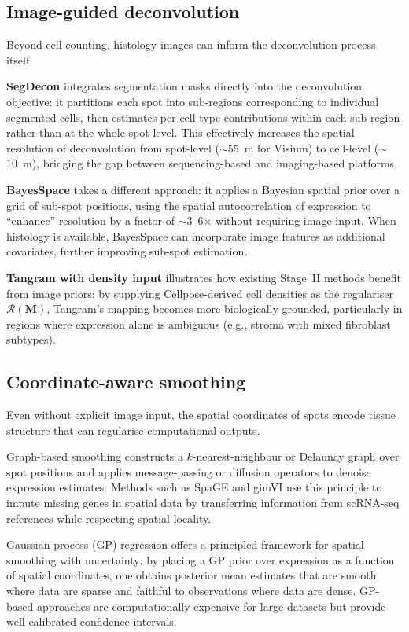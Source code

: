 \subsection{Image-guided deconvolution}

Beyond cell counting, histology images can inform the deconvolution process itself.

\textbf{SegDecon} integrates segmentation masks directly into the deconvolution objective: it partitions each spot into sub-regions corresponding to individual segmented cells, then estimates per-cell-type contributions within each sub-region rather than at the whole-spot level. This effectively increases the spatial resolution of deconvolution from spot-level ($\sim$55~\textmu m for Visium) to cell-level ($\sim$10~\textmu m), bridging the gap between sequencing-based and imaging-based platforms.

\textbf{BayesSpace} \citep{zhao2022bulk2space} takes a different approach: it applies a Bayesian spatial prior over a grid of sub-spot positions, using the spatial autocorrelation of expression to ``enhance'' resolution by a factor of $\sim$3--6$\times$ without requiring image input. When histology is available, BayesSpace can incorporate image features as additional covariates, further improving sub-spot estimation.

\textbf{Tangram with density input} illustrates how existing Stage~II methods benefit from image priors: by supplying Cellpose-derived cell densities as the regulariser $\mathcal{R}(\mathbf{M})$, Tangram's mapping becomes more biologically grounded, particularly in regions where expression alone is ambiguous (e.g., stroma with mixed fibroblast subtypes).

\subsection{Coordinate-aware smoothing}

Even without explicit image input, the spatial coordinates of spots encode tissue structure that can regularise computational outputs.

Graph-based smoothing constructs a $k$-nearest-neighbour or Delaunay graph over spot positions and applies message-passing or diffusion operators to denoise expression estimates. Methods such as SpaGE and gimVI use this principle to impute missing genes in spatial data by transferring information from scRNA-seq references while respecting spatial locality.

Gaussian process (GP) regression offers a principled framework for spatial smoothing with uncertainty: by placing a GP prior over expression as a function of spatial coordinates, one obtains posterior mean estimates that are smooth where data are sparse and faithful to observations where data are dense. GP-based approaches are computationally expensive for large datasets but provide well-calibrated confidence intervals.

